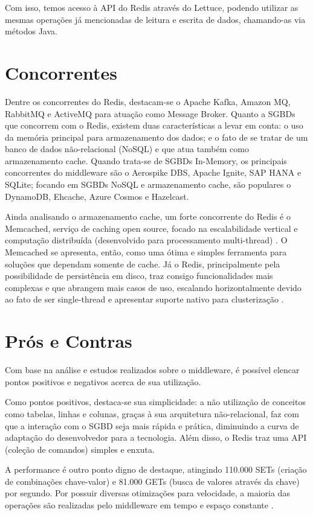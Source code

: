 \documentclass[12pt]{article}
\begin{document}
Com isso, temos acesso à API do Redis através do Lettuce, podendo utilizar as mesmas operações já mencionadas de leitura e escrita de dados, chamando-as via métodos Java.

\section{Concorrentes}
Dentre os concorrentes do Redis, destacam-se o Apache Kafka, Amazon MQ, RabbitMQ e ActiveMQ para atuação como Message Broker. Quanto a SGBDs que concorrem com o Redis, existem duas características a levar em conta: o uso da memória principal para armazenamento dos dados; e o fato de se tratar de um banco de dados não-relacional (NoSQL) e que atua também como armazenamento cache. Quando trata-se de SGBDs In-Memory, os principais concorrentes do middleware são o Aerospike DBS, Apache Ignite, SAP HANA e SQLite; focando em SGBDs NoSQL e armazenamento cache, são populares o DynamoDB, Ehcache, Azure Cosmos e Hazelcast.

Ainda analisando o armazenamento cache, um forte concorrente do Redis é o Memcached, serviço de caching open source, focado na escalabilidade vertical e computação distribuída (desenvolvido para processamento multi-thread) \cite{vicente2020}. O Memcached se apresenta, então, como uma ótima e simples ferramenta para soluções que dependam somente de cache. Já o Redis, principalmente pela possibilidade de persistência em disco, traz consigo funcionalidades mais complexas e que abrangem mais casos de uso, escalando horizontalmente devido ao fato de ser single-thread e apresentar suporte nativo para clusterização \cite{chen:16}.

\section{Prós e Contras}
Com base na análise e estudos realizados sobre o middleware, é possível elencar pontos positivos e negativos acerca de sua utilização.

Como pontos positivos, destaca-se sua simplicidade: a não utilização de conceitos como tabelas, linhas e colunas, graças à sua arquitetura não-relacional, faz com que a interação com o SGBD seja mais rápida e prática, diminuindo a curva de adaptação do desenvolvedor para a tecnologia. Além disso, o Redis traz uma API (coleção de comandos) simples e enxuta.

A performance é outro ponto digno de destaque, atingindo 110.000 SETs (criação de combinações chave-valor) e 81.000 GETs (busca de valores através da chave) por segundo. Por possuir diversas otimizações para velocidade, a maioria das operações são realizadas pelo middleware em tempo e espaço constante \cite{branagan:17}.
\end{document}
